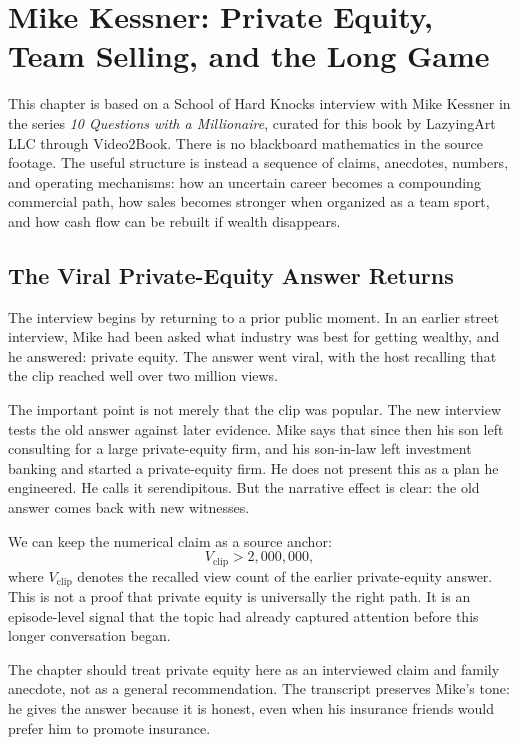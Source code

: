 \chapter{Mike Kessner: Private Equity, Team Selling, and the Long Game}

This chapter is based on a School of Hard Knocks interview with Mike Kessner in the series \emph{10 Questions with a Millionaire}, curated for this book by LazyingArt LLC through Video2Book. There is no blackboard mathematics in the source footage. The useful structure is instead a sequence of claims, anecdotes, numbers, and operating mechanisms: how an uncertain career becomes a compounding commercial path, how sales becomes stronger when organized as a team sport, and how cash flow can be rebuilt if wealth disappears.

\section{The Viral Private-Equity Answer Returns}

The interview begins by returning to a prior public moment. In an earlier street interview, Mike had been asked what industry was best for getting wealthy, and he answered: private equity. The answer went viral, with the host recalling that the clip reached well over two million views.

The important point is not merely that the clip was popular. The new interview tests the old answer against later evidence. Mike says that since then his son left consulting for a large private-equity firm, and his son-in-law left investment banking and started a private-equity firm. He does not present this as a plan he engineered. He calls it serendipitous. But the narrative effect is clear: the old answer comes back with new witnesses.

We can keep the numerical claim as a source anchor:
\begin{equation}
V_{\text{clip}} > 2{,}000{,}000,
\end{equation}
where \(V_{\text{clip}}\) denotes the recalled view count of the earlier private-equity answer. This is not a proof that private equity is universally the right path. It is an episode-level signal that the topic had already captured attention before this longer conversation began.

\begin{remark}
The chapter should treat private equity here as an interviewed claim and family anecdote, not as a general recommendation. The transcript preserves Mike's tone: he gives the answer because it is honest, even when his insurance friends would prefer him to promote insurance.
\end{remark}

